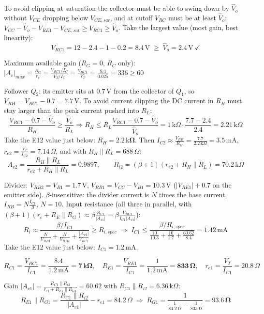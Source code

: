 \documentclass[11pt]{article}
\newcommand{\solstep}[2]{\par\medskip{\color{stepc}\textbf{Step #1 --- #2}}\par\nopagebreak}
\begin{document}
To avoid clipping at saturation the collector must be able to swing down by $\hat V_o$ without $V_{CE}$ dropping below $V_{CE,sat}$, and at cutoff $V_{RC}$ must be at least $\hat V_o$: $V_{CC} - \hat V_o - V_{RE1} - V_{CE,sat} \ge V_{RC1} \ge \hat V_o$. Take the largest value (most gain, best linearity): \[V_{RC1} = 12 - 2.4 - 1 - 0.2 = 8.4\,\mathrm{V} \;\ge\; \hat V_o = 2.4\,\mathrm{V}\ \checkmark\]

Maximum available gain ($R_G=0$, $R_C$ only): $|A_v|_{max} = \frac{R_C}{r_e} = \frac{V_{RC1}/I_C}{V_T/I_C} = \frac{V_{RC1}}{V_T} = \frac{8.4}{0.025} = 336 \ge 60$ \checkmark

Follower $Q_{2}$: its emitter sits at $0.7$\,V from the collector of $Q_{1}$, so $V_{RH} = V_{RC1} - 0.7 = 7.7\,\mathrm{V}$. To avoid current clipping the DC current in $R_H$ must stay larger than the peak current pushed into $R_L$: \[\frac{V_{RC1} - 0.7 - \hat V_o}{R_H} \ge \frac{\hat V_o}{R_L} \Rightarrow R_H \le R_L\frac{V_{RC1} - 0.7 - \hat V_o}{\hat V_o} = 1\,\mathrm{k}\Omega\cdot\frac{7.7 - 2.4}{2.4} = 2.21\,\mathrm{k}\Omega\]Take the E12 value just below: $R_H = \mathbf{2.2\,\mathrm{k}\Omega}$. Then $I_{C2} \approx \frac{V_{RH}}{R_H} = \frac{7.7}{2.2\,\mathrm{k}\Omega} = 3.5\,\mathrm{m}\mathrm{A}$, $r_{e2} = \frac{V_T}{I_{C2}} = 7.14\,\Omega$, and with $R_H \| R_L = 688\,\Omega$:\[A_{v2} = \frac{R_H\|R_L}{r_{e2} + R_H\|R_L} = 0.9897,\qquad R_{i2} = (\beta+1)(r_{e2} + R_H\|R_L) = 70.2\,\mathrm{k}\Omega\]
\solstep{3}{Bias current and resistors}Divider: $V_{RB2} = V_{B1} = 1.7\,\mathrm{V}$, $V_{RB1} = V_{CC} - V_{B1} = 10.3\,\mathrm{V}$ ($|V_{RE1}| + 0.7$ on the emitter side). $\beta$-insensitive: the divider current is $N$ times the base current, $I_{RB} = N\frac{I_{C1}}{\beta}$, $N = 10$. Input resistance (all three in parallel, with $(\beta+1)(r_e + R_E\|R_G) \approx \beta\frac{R_{C1}}{|A_{v1}|} = \beta\frac{V_{RC1}}{I_{C1}|A_{v1}|}$):\[R_i \approx \frac{\beta/I_{C1}}{\frac{N}{V_{RB1}} + \frac{N}{V_{RB2}} + \frac{|A_{v1}|}{V_{RC1}}} \ge R_{i,spec} \;\Rightarrow\; I_{C1} \le \frac{\beta/R_{i,spec}}{\frac{10}{10.3} + \frac{10}{1.7} + \frac{60.62}{8.4}} = 1.42\,\mathrm{m}\mathrm{A}\]Take the E12 value just below: $I_{C1} = 1.2\,\mathrm{m}\mathrm{A}$. 

\[R_{C1} = \frac{V_{RC1}}{I_{C1}} = \frac{8.4}{1.2\,\mathrm{m}\mathrm{A}} = \mathbf{7\,\mathrm{k}\Omega},\quad R_{E1} = \frac{V_{RE1}}{I_{C1}} = \frac{1}{1.2\,\mathrm{m}\mathrm{A}} = \mathbf{833\,\Omega},\quad r_{e1} = \frac{V_T}{I_{C1}} = 20.8\,\Omega\]

Gain $|A_{v1}| = \frac{R_{C1}\|R_{i2}}{r_{e1} + R_{E1}\|R_{G1}} = 60.62$ with $R_{C1}\|R_{i2} = 6.36\,\mathrm{k}\Omega$:\[R_{E1}\|R_{G1} = \frac{R_{C1}\|R_{i2}}{|A_{v1}|} - r_{e1} = 84.2\,\Omega \;\Rightarrow\; R_{G1} = \frac{1}{\frac{1}{84.2\,\Omega} - \frac{1}{833\,\Omega}} = \mathbf{93.6\,\Omega}\]
\end{document}
